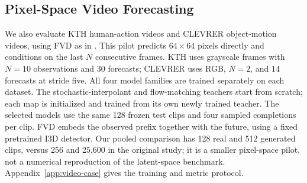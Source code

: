 \subsection{Pixel-Space Video Forecasting}\label{sec:video-main}
We also evaluate KTH human-action videos and CLEVRER object-motion videos, using FVD as in \citet{chen2024forecasting}. This pilot predicts $64\times64$ pixels directly and conditions on the last $N$ consecutive frames. KTH uses grayscale frames with $N=10$ observations and $30$ forecasts; CLEVRER uses RGB, $N=2$, and $14$ forecasts at stride five. All four model families are trained separately on each dataset. The stochastic-interpolant and flow-matching teachers start from scratch; each map is initialized and trained from its own newly trained teacher. The selected models use the same 128 frozen test clips and four sampled completions per clip. FVD embeds the observed prefix together with the future, using a fixed pretrained I3D detector. Our pooled comparison has 128 real and 512 generated clips, versus 256 and 25,600 in the original study; it is a smaller pixel-space pilot, not a numerical reproduction of the latent-space benchmark. Appendix~\ref{app:video-case} gives the training and metric protocol.

